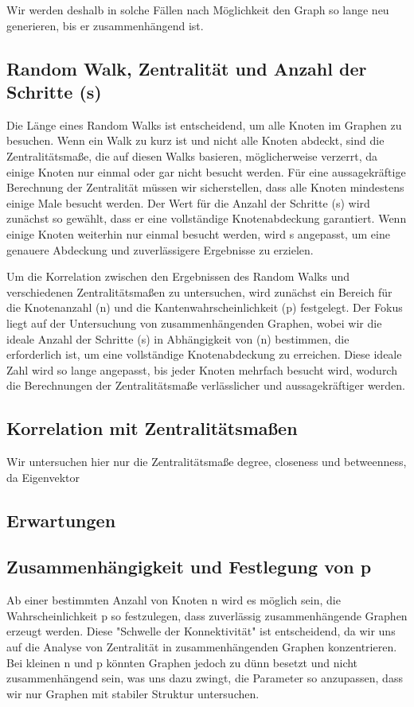  Wir werden deshalb in solche Fällen nach Möglichkeit den Graph so lange neu generieren, bis er zusammenhängend ist.

 

\subsection{Random Walk, Zentralität und Anzahl der Schritte 	(s)}
 Die Länge eines Random Walks ist entscheidend, um alle Knoten im Graphen zu besuchen. Wenn ein Walk zu kurz ist und nicht alle Knoten abdeckt, sind die Zentralitätsmaße, die auf diesen Walks basieren, möglicherweise verzerrt, da einige Knoten nur einmal oder gar nicht besucht werden. Für eine aussagekräftige 	Berechnung der Zentralität müssen wir sicherstellen, dass alle 	Knoten mindestens einige Male besucht werden. Der Wert für die Anzahl der Schritte (s) wird zunächst so gewählt, dass er eine 	vollständige Knotenabdeckung garantiert. Wenn einige Knoten 	weiterhin nur einmal besucht werden, wird s angepasst, um eine 	genauere Abdeckung und zuverlässigere Ergebnisse zu erzielen. 

 Um die Korrelation zwischen den Ergebnissen des Random Walks und verschiedenen Zentralitätsmaßen 	zu untersuchen, wird zunächst ein Bereich für die Knotenanzahl (n) und die Kantenwahrscheinlichkeit (p) festgelegt. Der Fokus liegt auf der Untersuchung von zusammenhängenden Graphen, wobei wir die ideale Anzahl der Schritte (s) in Abhängigkeit von (n) bestimmen, die erforderlich ist, um eine vollständige Knotenabdeckung zu erreichen. Diese ideale Zahl wird so lange angepasst, bis jeder 	Knoten mehrfach besucht wird, wodurch die Berechnungen der 	Zentralitätsmaße verlässlicher und aussagekräftiger werden.

 

\subsection{Korrelation mit Zentralitätsmaßen}
 Wir untersuchen hier nur die Zentralitätsmaße degree, closeness und betweenness, da Eigenvektor 


\subsection{Erwartungen}
\subsection{Zusammenhängigkeit und Festlegung von p }
 Ab einer bestimmten Anzahl von Knoten n wird es möglich sein, die Wahrscheinlichkeit p so festzulegen, dass zuverlässig zusammenhängende Graphen erzeugt werden. Diese "Schwelle der Konnektivität" ist entscheidend, da wir uns auf die Analyse von Zentralität in zusammenhängenden Graphen konzentrieren. Bei kleinen n und p könnten Graphen jedoch zu dünn besetzt und nicht zusammenhängend sein, was uns dazu zwingt, die Parameter so anzupassen, dass wir nur Graphen mit stabiler Struktur untersuchen. 

